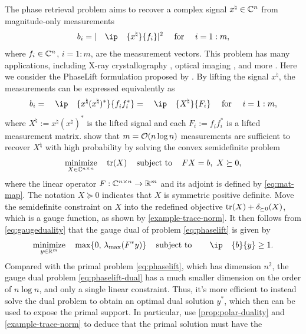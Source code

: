 \begin{example}
  The phase retrieval problem aims to recover a complex signal
  $x^\natural\in\mathbb{C}^n$ from magnitude-only measurements
  \[
    b_i = |\ip{x^\natural}{f_i}|^2 \text{ for } i = 1:m,
  \]
   where $f_i \in \mathbb{C}^n$, $i = 1:m$, are the measurement vectors.
  This problem has many applications, including X-ray crystallography
  \cite{harrison:93}, optical imaging \cite{shechtman2015phase}, and more
  \cite{candes:2013}. Here we consider the PhaseLift formulation proposed by
  \citet{candes2013phaselift}. By lifting the signal $x^\natural$, the measurements can
  be expressed equivalently as
  \[
    b_i = \ip{x^\natural (x^\natural)^*}{f_i^{}f_i^*} = \ip{X^\natural}{F_i}
    \text{ for } i = 1:m,
  \]
  where $X^\natural := x^\natural (x^\natural)^*$ is the lifted signal and
  each $F_i := f_i^{}f_i^*$ is a lifted measurement matrix.
  \citet{candes2013phaselift} show that $m = \mathcal{O}(n\log n)$ measurements are
  sufficient to recover $X^\natural$ with high probability by solving the
  convex semidefinite problem
  \begin{equation} \label{eq:phaselift}
    \displaystyle\mathop{\hbox{\rm minimize}}_{X \in \mathbb{C}^{n\times n}}\enspace\enspace \operatorname{tr}(X)
    \enspace\enspace\mathop{\hbox{\rm subject to}}\enspace\enspace F X = b,\ X \succeq 0,
  \end{equation}
  where the linear operator $F:\mathbb{C}^{n\times n}\to\mathbb{R}^m$ and its adjoint is defined
  by \eqref{eq:mat-map}.
  The notation $X\succeq0$
  indicates that $X$ is symmetric positive definite.
  Move the semidefinite constraint on $X$ into the
  redefined objective $\operatorname{tr}(X)+\delta_{\succeq0}(X)$, which is a gauge
  function, as shown by \autoref{example-trace-norm}. It then follows from
  \eqref{eq:gaugeduality} that the gauge dual of problem \eqref{eq:phaselift}
  is given by 
  \begin{equation} \label{eq:phaselift-dual}
    \minimize{y \in \Re^{m}}\enspace \max\{0,\,\lambda_{\max}(F^*y)\} \enspace\st\enspace \ip{b}{y} \geq 1.
  \end{equation}
  Compared with the primal problem \eqref{eq:phaselift}, which has dimension
  $n^2$, the gauge dual problem \eqref{eq:phaselift-dual} has a much smaller
  dimension on the order of $n\log n$, and only a single linear constraint.
  Thus, it's more efficient to instead solve the dual problem to obtain an
  optimal dual solution $y^*$, which then can be used to expose the primal
  support. In particular, use \autoref{prop:polar-duality} and
  \autoref{example-trace-norm} to deduce that the primal solution must have the

\end{example}
